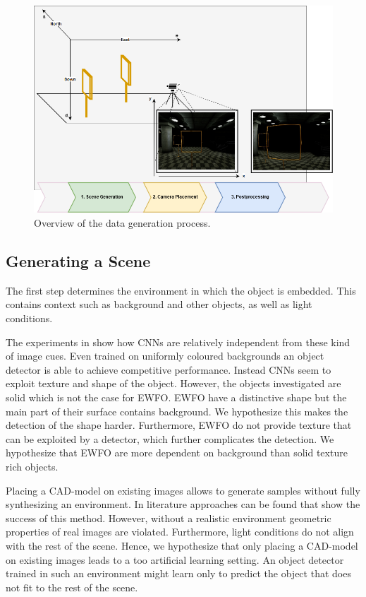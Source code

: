 \begin{figure}[htbp]
	\centering
	\includegraphics[width=\textwidth]{fig/datagen_notation}
	\caption{Overview of the data generation process.}
	\label{fig:training:datagen_notation}
\end{figure}



\subsection{Generating a Scene}
\label{sec:training:scene}

The first step determines the environment in which the object is embedded. This contains context such as background and other objects, as well as light conditions. 

The experiments in \cite{Peng} show how \acp{CNN} are relatively independent from these kind of image cues. Even trained on uniformly coloured backgrounds an object detector is able to achieve competitive performance. Instead \acp{CNN} seem to exploit texture and shape of the object. However, the objects investigated are solid which is not the case for \ac{EWFO}. \ac{EWFO} have a distinctive shape but the main part of their surface contains background. We hypothesize this makes the detection of the shape harder. Furthermore, \ac{EWFO} do not provide texture that can be exploited by a detector, which further complicates the detection. We hypothesize that \ac{EWFO} are more dependent on background than solid texture rich objects. 

Placing a \ac{CAD}-model on existing images allows to generate samples without fully synthesizing an environment. In literature \cite{Madaan2017, Peng} approaches can be found that show the success of this method. However, without a realistic environment geometric properties of real images are violated. Furthermore, light conditions do not align with the rest of the scene. Hence, we hypothesize that only placing a \ac{CAD}-model on existing images leads to a too artificial learning setting. An object detector trained in such an environment might learn only to predict the object that does not fit to the rest of the scene.

